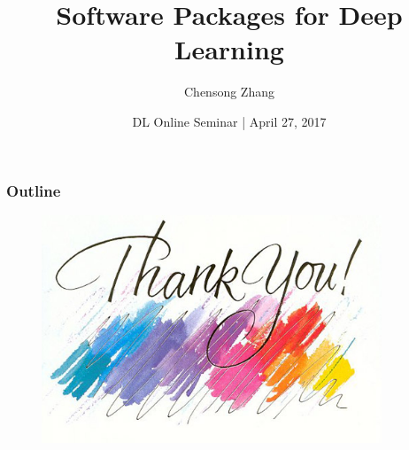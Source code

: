 \documentclass[trans,compress,xcolor=pdftex,dvipsnames,table]{beamer}
\title[DL]
{\LARGE Software Packages for Deep Learning}
\author[Chensong Zhang]{Chensong Zhang}
\institute[LSEC]
{with {\color{RubineRed}Zheng Li} and  {\color{RubineRed}Ronghong Fan}\\[1.5cm]}
\date{\small {\color{OliveGreen}DL Online Seminar} | {\color{DarkOrchid}April 27, 2017}}
\newif\ifframeinlbf
\newif\ifframeinlbf
\begin{document}

\begin{frame}[plain]
  \titlepage
\end{frame}

\addtocounter{framenumber}{-1} %


\frameinlbffalse


\begin{frame}[plain]
  \frametitle{Outline}
  \setcounter{tocdepth}{1}
  \tableofcontents
\end{frame}
\addtocounter{framenumber}{-1} %

\frameinlbftrue










\begin{frame}[plain]
\addtocounter{framenumber}{-1} %

\begin{figure}[htbp] %
   \centering
   \includegraphics[width=4in]{figures/ThankYou.jpg} 
\end{figure}

\end{frame}

\end{document}
